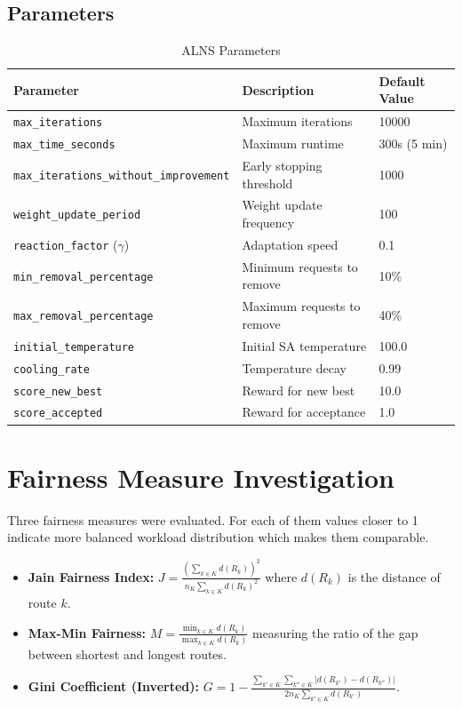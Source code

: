 \documentclass[a4paper]{scrartcl}
\begin{document}
\subsection{Parameters}
\begin{table}[H]
\centering
\caption{ALNS Parameters}
\begin{tabular}{l l l}
\toprule
Parameter & Description & Default Value \\
\midrule
\texttt{max\_iterations} & Maximum iterations & 10000 \\
\texttt{max\_time\_seconds} & Maximum runtime & 300s (5 min) \\
\texttt{max\_iterations\_without\_improvement} & Early stopping threshold & 1000 \\
\texttt{weight\_update\_period} & Weight update frequency & 100 \\
\texttt{reaction\_factor} ($\gamma$) & Adaptation speed & 0.1 \\
\texttt{min\_removal\_percentage} & Minimum requests to remove & 10\% \\
\texttt{max\_removal\_percentage} & Maximum requests to remove & 40\% \\
\texttt{initial\_temperature} & Initial SA temperature & 100.0 \\
\texttt{cooling\_rate} & Temperature decay & 0.99 \\
\texttt{score\_new\_best} & Reward for new best & 10.0 \\
\texttt{score\_accepted} & Reward for acceptance & 1.0 \\
\bottomrule
\end{tabular}
\end{table}

\section{Fairness Measure Investigation}

Three fairness measures were evaluated.
For each of them values closer to 1 indicate more balanced workload distribution which makes them comparable.
\begin{itemize}
    \item \textbf{Jain Fairness Index:} $J = \frac{(\sum_{k \in K} d(R_k))^2}{n_K \sum_{k \in K} d(R_k)^2}$
    where $d(R_k)$ is the distance of route $k$.
    \item \textbf{Max-Min Fairness:} $M = \frac{\min_{k \in K} d(R_k)}{\max_{k \in K} d(R_k)}$ measuring the ratio
    of the gap between shortest and longest routes.
    \item \textbf{Gini Coefficient (Inverted):}
    $G = 1 - \frac{\sum_{k' \in K} \sum_{k'' \in K} |d(R_{k'}) - d(R_{k''})| }{2 n_K \sum_{k' \in K} d(R_{k'})}$.
\end{itemize}
\end{document}
